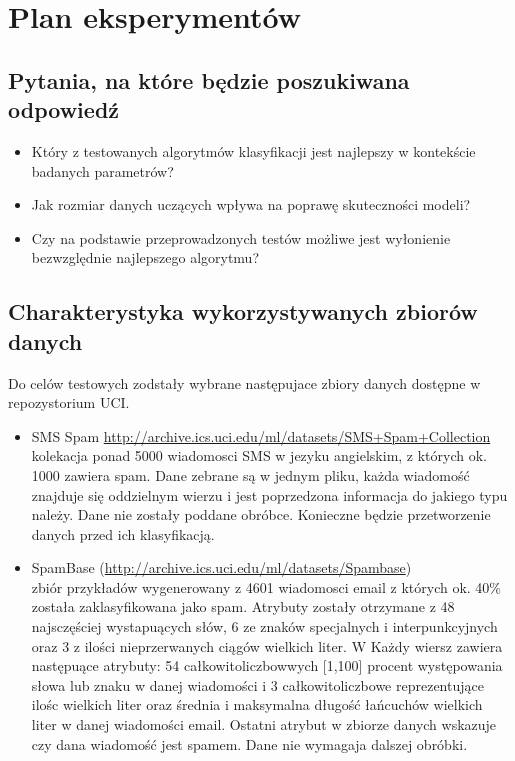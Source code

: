 \documentclass[a4paper, 10pt]{article}
\begin{document}

\section{Plan eksperymentów}
\subsection{Pytania, na które będzie poszukiwana odpowiedź}

\begin{itemize}
\item{Który z testowanych algorytmów klasyfikacji jest najlepszy w kontekście badanych parametrów?}
\item{Jak rozmiar danych uczących wpływa na poprawę skuteczności modeli?}
\item{Czy na podstawie przeprowadzonych testów możliwe jest wyłonienie bezwzględnie najlepszego algorytmu?}
\end{itemize}

\subsection{Charakterystyka wykorzystywanych zbiorów danych}

Do celów testowych zodstały wybrane następujace zbiory danych dostępne w repozystorium UCI.


\begin{itemize}
\item{SMS Spam \url{http://archive.ics.uci.edu/ml/datasets/SMS+Spam+Collection} \\ kolekacja ponad 5000 wiadomosci SMS w jezyku angielskim, z których ok. 1000 zawiera spam. Dane zebrane są w jednym pliku, każda wiadomość znajduje się oddzielnym wierzu i 
jest poprzedzona informacja do jakiego typu należy. Dane nie zostały poddane obróbce. Konieczne będzie przetworzenie danych przed ich klasyfikacją.} 
\item{SpamBase (\url{http://archive.ics.uci.edu/ml/datasets/Spambase}) \\ zbiór przykładów wygenerowany z 4601 wiadomosci email z których ok. 40\% została zaklasyfikowana jako spam. Atrybuty zostały otrzymane z 48 najsczęściej wystapuących słów, 6 ze znaków specjalnych i interpunkcyjnych oraz 3 z ilości nieprzerwanych ciągów wielkich liter.  W Każdy wiersz zawiera następuące atrybuty: 54 całkowitoliczbowwych [1,100] procent występowania słowa lub znaku w danej wiadomości i 3 całkowitoliczbowe reprezentujące ilośc wielkich liter oraz średnia i maksymalna długość łańcuchów wielkich liter w danej wiadomości email. Ostatni atrybut w zbiorze danych wskazuje czy dana wiadomość jest spamem. Dane nie wymagaja dalszej obróbki. }

\end{itemize}
\end{document}
